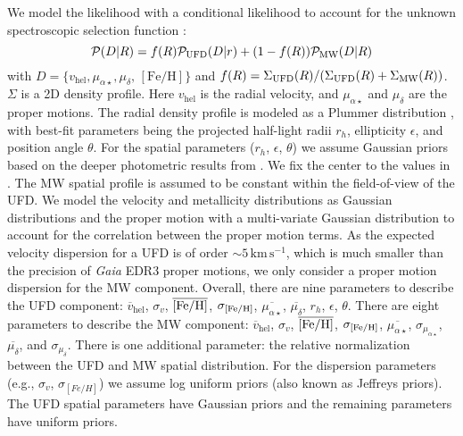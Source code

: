 \documentclass[twocolumn]{aastex63}
\newcommand{\unit}[1]{\ensuremath{\mathrm{\,#1}}\xspace}
\newcommand{\kms}{\unit{km\,s^{-1}}}
\newcommand{\feh}{\unit{[Fe/H]}}
\begin{document}
We model the likelihood with a conditional likelihood to account for the unknown spectroscopic selection function \citep[e.g.,][]{Martinez2011ApJ...738...55M, Horigome2020MNRAS.499.3320H}:
\begin{equation}
\mathcal{P}( D| R)  = f(R) \mathcal{P}_{{\rm UFD}}(D|r) + \\(1-f (R)) \mathcal{P}_{\rm MW} (D|R)
\end{equation}
\noindent with $D=\{ v_\mathrm{hel}, \mu_{\alpha \star}, \mu_{\delta}, \feh\}$ and $f(R) = \Sigma_{\rm UFD}(R)/(\Sigma_{\rm UFD}(R) + \Sigma_{\rm MW}(R))$. $\Sigma$ is a 2D density profile.
Here $v_\mathrm{hel}$ is the radial velocity, and $\mu_{\alpha \star}$ and $\mu_{\delta}$ are the proper motions.
The radial density profile is modeled as a Plummer distribution \citep{Plummer1911MNRAS..71..460P}, with best-fit parameters being the projected half-light radii $r_h$, ellipticity $\epsilon$, and position angle $\theta$.  For the spatial parameters ($r_h$, $\epsilon$, $\theta$) we assume Gaussian priors based on the deeper photometric results from \citet{mun2018}.  We fix the center to the values in \citet{mun2018}.
The MW spatial profile is assumed to be constant within the field-of-view of the UFD. 
We model the velocity and metallicity distributions as Gaussian distributions and the proper motion with a multi-variate Gaussian distribution to account for the correlation between the proper motion terms.
As the expected velocity dispersion for a UFD is of order $\sim 5\kms$, which is much smaller than the precision of {\it Gaia} EDR3 proper motions, we only consider a proper motion dispersion for the MW component.
Overall, there are nine parameters to describe the UFD component: $\overline{v}_\mathrm{hel}$, $\sigma_v$, $\overline{{\rm [Fe/H]}}$, $\sigma_{\rm [Fe/H]}$, $\overline{\mu_{\alpha \star}}$, $\overline{\mu_{\delta}}$, $r_h$, $\epsilon$, $\theta$.
There are eight parameters to describe the MW component: $\overline{v}_\mathrm{hel}$, $\sigma_v$, $\overline{{\rm [Fe/H]}}$, $\sigma_{\rm [Fe/H]}$, $\overline{\mu_{\alpha \star}}$, $\sigma_{\mu_{\alpha \star}}$, $\overline{\mu_{\delta}}$, and $\sigma_{\mu_{\delta}}$.  There is one additional parameter: the relative normalization between the UFD and MW spatial distribution.
For the dispersion parameters (e.g., $\sigma_v$, $\sigma_{[Fe/H]}$) we assume log uniform priors (also known as Jeffreys priors). The UFD spatial parameters have Gaussian priors and the remaining parameters have uniform priors.
\end{document}
